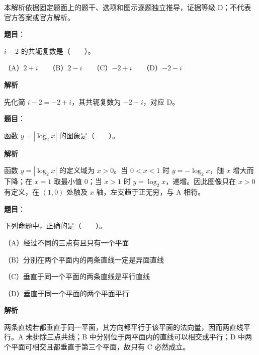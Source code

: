 

本解析依据固定题面上的题干、选项和图示逐题独立推导，证据等级 D；不代表官方答案或官方解析。


\begin{answer}

\textbf{题目}：

$i-2$ 的共轭复数是\mbox{（　　）}。

（A）$2+i$　　（B）$2-i$　　（C）$-2+i$　　（D）$-2-i$

\textbf{解析}

先化简 $i-2=-2+i$，其共轭复数为 $-2-i$，对应 D。


\end{answer}
\begin{answer}

\textbf{题目}：

函数 $y=|\log_2 x|$ 的图象是\mbox{（　　）}。
\nopagebreak[4]
\begin{center}\end{center}
\nopagebreak[4]
\textbf{解析}

函数 $y=|\log_2x|$ 的定义域为 $x>0$。当 $0<x<1$ 时 $y=-\log_2x$，随 $x$ 增大而下降；在 $x=1$ 取最小值 $0$；当 $x>1$ 时 $y=\log_2x$，递增。因此图像只在 $x>0$ 有定义，在 $(1,0)$ 处触及 $x$ 轴，左支趋于正无穷，与 A 相符。


\end{answer}
\begin{answer}

\textbf{题目}：

下列命题中，正确的是\mbox{（　　）}。

（A）经过不同的三点有且只有一个平面

（B）分别在两个平面内的两条直线一定是异面直线

（C）垂直于同一个平面的两条直线是平行直线

（D）垂直于同一个平面的两个平面平行

\textbf{解析}

两条直线若都垂直于同一平面，其方向都平行于该平面的法向量，因而两直线平行。A 未排除三点共线；B 中分别位于两平面内的直线可以相交或平行；D 中两个平面可相交且都垂直于第三个平面，故只有 C 必然成立。


\end{answer}

